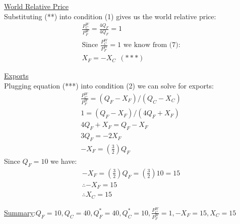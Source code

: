 \documentclass{article}
\begin{document}
\underline{World Relative Price} \\
Substituting (**) into condition (1) gives us the world relative price:
\begin{gather*}
  \tfrac{P_{C}^{W}}{P_{F}^{W}} = \tfrac{4Q_{F}}{4Q_{F}} = 1 \\
  \text{Since } \tfrac{P_{C}^{W}}{P_{F}^{W}} = 1 \text{ we know from (7):} \\
  X_{F} = -X_{C} \ \ (***)
\end{gather*}

\underline{Exports} \\
Plugging equation (***) into condition (2) we can solve for exports:
\begin{gather*}
  \tfrac{P_{C}^{W}}{P_{F}^{W}} = (Q_{F} - X_{F})/(Q_{C} - X_{C}) \\
  1 = (Q_{F} - X_{F})/(4Q_{F} + X_{F}) \\
  4Q_{F} + X_{F} = Q_{F} - X_{F}  \\
  3Q_{F} = -2X_{F} \\
  -X_{F} = (\tfrac{3}{2})Q_{F}
\end{gather*}
Since $Q_{F} = 10$ we have:
\begin{gather*}
  -X_{F} = (\tfrac{3}{2})Q_{F} = (\tfrac{3}{2})10 = 15 \\
  \therefore -X_{F} = 15 \\
  \therefore X_{C} = 15
\end{gather*}

\underline{Summary}:$ Q_{F} = 10, Q_{C} = 40, Q_{F}^{*} = 40, Q_{C}^{*} = 10, \tfrac{P_{C}^{W}}{P_{F}^{W}} = 1, -X_{F} = 15, X_{C} = 15$
\end{document}
